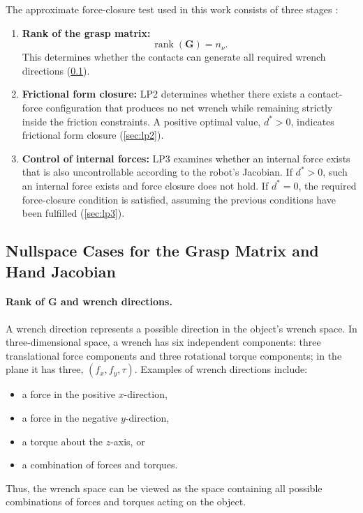 The approximate force-closure test used in this work consists of three
stages \cite[Sec.~28.4.2]{prattichizzo2008grasping}:
\begin{enumerate}
    \item \textbf{Rank of the grasp matrix:}
    \begin{equation}
        \operatorname{rank}(\boldsymbol{G})=n_{\nu}.
    \end{equation}
    This determines whether the contacts can generate all required wrench
    directions (\cref{sec:nullspace-cases}).

    \item \textbf{Frictional form closure:}
    LP2 determines whether there exists a contact-force configuration that
    produces no net wrench while remaining strictly inside the friction
    constraints. A positive optimal value, $d^*>0$, indicates frictional form
    closure (\cref{sec:lp2}).

    \item \textbf{Control of internal forces:}
    LP3 examines whether an internal force exists that is also uncontrollable
    according to the robot's Jacobian. If $d^*>0$, such an internal force
    exists and force closure does not hold. If $d^*=0$, the required
    force-closure condition is satisfied, assuming the previous conditions
    have been fulfilled (\cref{sec:lp3}).
\end{enumerate}

\subsection{Nullspace Cases for the Grasp Matrix and Hand Jacobian}
\label{sec:nullspace-cases}

\paragraph{Rank of $\boldsymbol{G}$ and wrench directions.}
A wrench direction represents a possible direction in the object's wrench
space. In three-dimensional space, a wrench has six independent components:
three translational force components and three rotational torque
components; in the plane it has three, $(f_x, f_y, \tau)$. Examples of
wrench directions include:
\begin{itemize}
    \item a force in the positive $x$-direction,
    \item a force in the negative $y$-direction,
    \item a torque about the $z$-axis, or
    \item a combination of forces and torques.
\end{itemize}
Thus, the wrench space can be viewed as the space containing all possible
combinations of forces and torques acting on the object.

